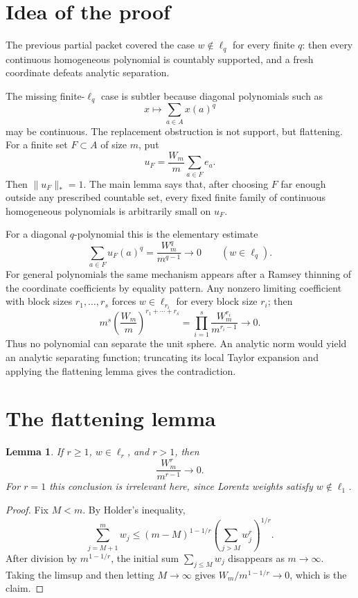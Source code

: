\documentclass[11pt]{article}
\newtheorem{lemma}{Lemma}
\begin{document}
\section{Idea of the proof}

The previous partial packet covered the case \(w\notin\ell_q\) for every
finite \(q\): then every continuous homogeneous polynomial is countably
supported, and a fresh coordinate defeats analytic separation.

The missing finite-\(\ell_q\) case is subtler because diagonal polynomials
such as
\[
  x\mapsto \sum_{a\in A}x(a)^q
\]
may be continuous.  The replacement obstruction is not support, but
flattening.  For a finite set \(F\subset A\) of size \(m\), put
\[
  u_F=\frac{W_m}{m}\sum_{a\in F} e_a .
\]
Then \(\|u_F\|_*=1\).  The main lemma says that, after choosing \(F\) far
enough outside any prescribed countable set, every fixed finite family of
continuous homogeneous polynomials is arbitrarily small on \(u_F\).

For a diagonal \(q\)-polynomial this is the elementary estimate
\[
  \sum_{a\in F} u_F(a)^q
  =
  \frac{W_m^q}{m^{q-1}}\longrightarrow0
  \qquad (w\in\ell_q).
\]
For general polynomials the same mechanism appears after a Ramsey thinning of
the coordinate coefficients by equality pattern.  Any nonzero limiting
coefficient with block sizes \(r_1,\ldots,r_s\) forces
\(w\in\ell_{r_i}\) for every block size \(r_i\); then
\[
  m^s\left(\frac{W_m}{m}\right)^{r_1+\cdots+r_s}
  =
  \prod_{i=1}^s \frac{W_m^{r_i}}{m^{r_i-1}}
  \longrightarrow0 .
\]
Thus no polynomial can separate the unit sphere.  An analytic norm would yield
an analytic separating function; truncating its local Taylor expansion and
applying the flattening lemma gives the contradiction.

\section{The flattening lemma}

\begin{lemma}\label{lem:lq-decay}
If \(r\ge1\), \(w\in\ell_r\), and \(r>1\), then
\[
  \frac{W_m^r}{m^{r-1}}\longrightarrow0 .
\]
For \(r=1\) this conclusion is irrelevant here, since Lorentz weights satisfy
\(w\notin\ell_1\).
\end{lemma}

\begin{proof}
Fix \(M<m\).  By Holder's inequality,
\[
  \sum_{j=M+1}^m w_j
  \le
  (m-M)^{1-1/r}
  \left(\sum_{j>M}w_j^r\right)^{1/r}.
\]
After division by \(m^{1-1/r}\), the initial sum
\(\sum_{j\le M}w_j\) disappears as \(m\to\infty\).  Taking the limsup and then
letting \(M\to\infty\) gives \(W_m/m^{1-1/r}\to0\), which is the claim.
\end{proof}
\end{document}
